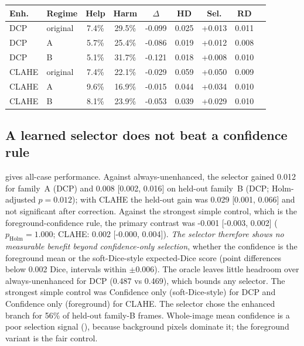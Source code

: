 \documentclass{midl}
\begin{document}
\begin{table}[!htbp]
{\scriptsize\begin{tabular}{llccccccc}\toprule Enh. & Regime & Help & Harm & $\Delta$ & HD & Sel. & RD\\\midrule
DCP & original & 7.4\% & 29.5\% & -0.099 & 0.025 & +0.013 & 0.011 \\
DCP & A & 5.7\% & 25.4\% & -0.086 & 0.019 & +0.012 & 0.008 \\
DCP & B & 5.1\% & 31.7\% & -0.121 & 0.018 & +0.008 & 0.010 \\
\midrule
CLAHE & original & 7.4\% & 22.1\% & -0.029 & 0.059 & +0.050 & 0.009 \\
CLAHE & A & 9.6\% & 16.9\% & -0.015 & 0.044 & +0.034 & 0.010 \\
CLAHE & B & 8.1\% & 23.9\% & -0.053 & 0.039 & +0.029 & 0.010 \\
\bottomrule\end{tabular}}
\end{table}
\subsection{A learned selector does not beat a confidence rule}
 gives all-case performance. Against always-unenhanced, the selector gained 0.012 for family~A (DCP) and 0.008 [0.002, 0.016] on held-out family~B (DCP; Holm-adjusted $p=0.012$); with CLAHE the held-out gain was 0.029 [0.001, 0.066] and not significant after correction. Against the strongest simple control, which is the foreground-confidence rule, the primary contrast was -0.001 [-0.003, 0.002] ($p_{\mathrm{Holm}}=1.000$; CLAHE: 0.002 [-0.000, 0.004]). \emph{The selector therefore shows no measurable benefit beyond confidence-only selection}, whether the confidence is the foreground mean or the soft-Dice-style expected-Dice score (point differences below 0.002 Dice, intervals within $\pm0.006$). The oracle leaves little headroom over always-unenhanced for DCP (0.487 vs 0.469), which bounds any selector. The strongest simple control was Confidence only (soft-Dice-style) for DCP and Confidence only (foreground) for CLAHE. The selector chose the enhanced branch for 56\% of held-out family-B frames. Whole-image mean confidence is a poor selection signal (), because background pixels dominate it; the foreground variant is the fair control.
\end{document}
